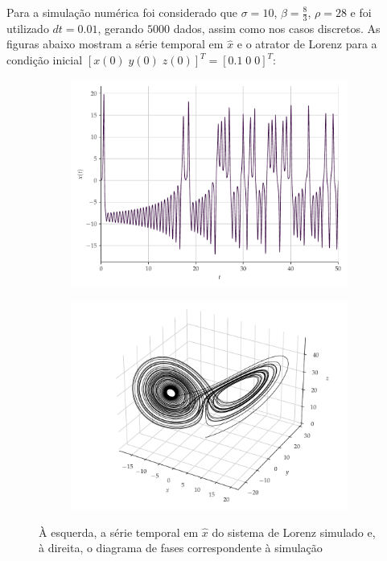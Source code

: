 \documentclass[9pt, technote]{article}
\begin{document}
Para a simulação numérica foi considerado que $\sigma = 10$, $\beta = \frac{8}{3}$, $\rho = 28$ e foi utilizado $dt = 0.01$, gerando $5000$ dados, assim como nos casos discretos. As figuras abaixo mostram a série temporal em $\hat{x}$ e o atrator de Lorenz para a condição inicial $[x(0)\; y(0)\; z(0)]^T = [0.1\; 0\; 0]^T$:
\begin{figure}[H]
     \begin{subfigure}[t]{0.24\textwidth} 
         \includegraphics[scale=0.24]{serie-lorenz-x.pdf}
     \end{subfigure}
     \centering
     \begin{subfigure}[t]{0.24\textwidth}
         \includegraphics[scale=0.24]{diagrama-de-fases-lorenz.pdf}
     \end{subfigure}
     \caption{À esquerda, a série temporal em $\hat{x}$ do sistema de Lorenz simulado e, à direita, o diagrama de fases correspondente à simulação}
     \label{fig:lorenz}
\end{figure}
\end{document}
